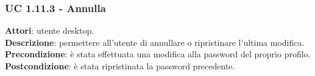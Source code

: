 	\subsubsection{UC 1.11.3 - Annulla}{
		\label{uc1.11.3}
		\textbf{Attori}: utente desktop. \\
		\textbf{Descrizione}: permettere all’utente di annullare o ripristinare l'ultima modifica. \\
		\textbf{Precondizione}: è stata effettuata una modifica alla password del proprio profilo.	\\
		\textbf{Postcondizione}: è stata ripristinata la password precedente.
		}
